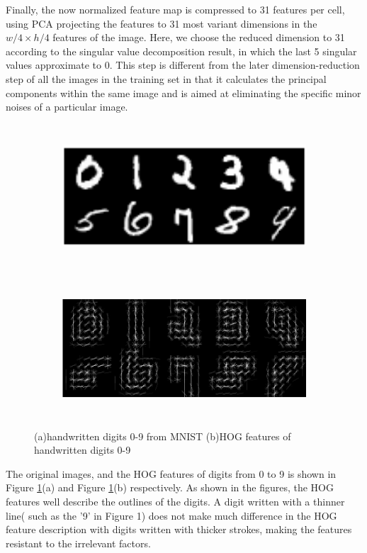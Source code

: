 \documentclass[12pt]{article}
\begin{document}
Finally, the now normalized feature map is compressed to 31 features per cell, using PCA projecting the features to 31 most variant dimensions in the $ w/4 \times h/4 $ features of the image. Here, we choose the reduced dimension to 31 according to the singular value decomposition result, in which the last 5 singular values approximate to 0. This step is different from the later dimension-reduction step of all the images in the training set in that it calculates the principal components within the same image and is aimed at eliminating the specific minor noises of a particular image.
\begin{figure}[h]
\centering
	\begin{subfigure}{.85\textwidth}
		\includegraphics[height = 2.1in]{image.png}		
		\caption{ }
	\end{subfigure}
	\begin{subfigure}{.85\textwidth}
		\includegraphics[height = 2in]{hog.png}	
		\caption{ }
	\end{subfigure}
	\caption{ (a)handwritten digits 0-9 from MNIST (b)HOG features of handwritten digits 0-9}
	\label{fig:hog}
	\end{figure}

The original images, and the HOG features of digits from 0 to 9 is shown in Figure \ref{fig:hog}(a) and Figure \ref{fig:hog}(b) respectively. As shown in the figures, the HOG features well describe the outlines of the digits. A digit written with a thinner line( such as the '9' in Figure 1) does not make much difference in the HOG feature description with digits written with thicker strokes, making the features resistant to the irrelevant factors.
\end{document}
